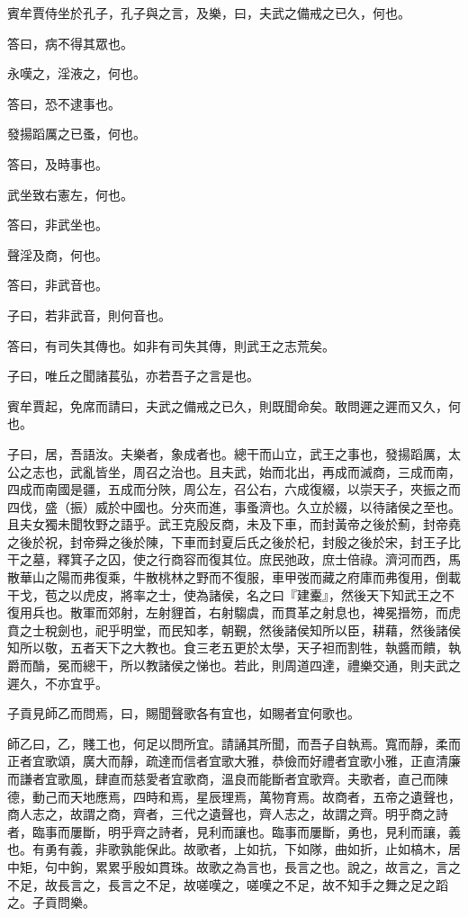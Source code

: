 賓牟賈侍坐於孔子，孔子與之言，及樂，曰，夫武之備戒之已久，何也。

答曰，病不得其眾也。

永嘆之，淫液之，何也。

答曰，恐不逮事也。

發揚蹈厲之已蚤，何也。

答曰，及時事也。

武坐致右憲左，何也。

答曰，非武坐也。

聲淫及商，何也。

答曰，非武音也。

子曰，若非武音，則何音也。

答曰，有司失其傳也。如非有司失其傳，則武王之志荒矣。

子曰，唯丘之聞諸萇弘，亦若吾子之言是也。

賓牟賈起，免席而請曰，夫武之備戒之已久，則既聞命矣。敢問遲之遲而又久，何也。

子曰，居，吾語汝。夫樂者，象成者也。總干而山立，武王之事也，發揚蹈厲，太公之志也，武亂皆坐，周召之治也。且夫武，始而北出，再成而滅商，三成而南，四成而南國是疆，五成而分陜，周公左，召公右，六成復綴，以崇天子，夾振之而四伐，盛（振）威於中國也。分夾而進，事蚤濟也。久立於綴，以待諸侯之至也。且夫女獨未聞牧野之語乎。武王克殷反商，未及下車，而封黃帝之後於薊，封帝堯之後於祝，封帝舜之後於陳，下車而封夏后氏之後於杞，封殷之後於宋，封王子比干之墓，釋箕子之囚，使之行商容而復其位。庶民弛政，庶士倍祿。濟河而西，馬散華山之陽而弗復乘，牛散桃林之野而不復服，車甲弢而藏之府庫而弗復用，倒載干戈，苞之以虎皮，將率之士，使為諸侯，名之曰『建櫜』，然後天下知武王之不復用兵也。散軍而郊射，左射貍首，右射騶虞，而貫革之射息也，裨冕搢笏，而虎賁之士稅劍也，祀乎明堂，而民知孝，朝覲，然後諸侯知所以臣，耕藉，然後諸侯知所以敬，五者天下之大教也。食三老五更於太學，天子袒而割牲，執醬而饋，執爵而酳，冕而總干，所以教諸侯之悌也。若此，則周道四達，禮樂交通，則夫武之遲久，不亦宜乎。

子貢見師乙而問焉，曰，賜聞聲歌各有宜也，如賜者宜何歌也。

師乙曰，乙，賤工也，何足以問所宜。請誦其所聞，而吾子自執焉。寬而靜，柔而正者宜歌頌，廣大而靜，疏達而信者宜歌大雅，恭儉而好禮者宜歌小雅，正直清廉而謙者宜歌風，肆直而慈愛者宜歌商，溫良而能斷者宜歌齊。夫歌者，直己而陳德，動己而天地應焉，四時和焉，星辰理焉，萬物育焉。故商者，五帝之遺聲也，商人志之，故謂之商，齊者，三代之遺聲也，齊人志之，故謂之齊。明乎商之詩者，臨事而屢斷，明乎齊之詩者，見利而讓也。臨事而屢斷，勇也，見利而讓，義也。有勇有義，非歌孰能保此。故歌者，上如抗，下如隊，曲如折，止如槁木，居中矩，句中鉤，累累乎殷如貫珠。故歌之為言也，長言之也。說之，故言之，言之不足，故長言之，長言之不足，故嗟嘆之，嗟嘆之不足，故不知手之舞之足之蹈之。子貢問樂。

